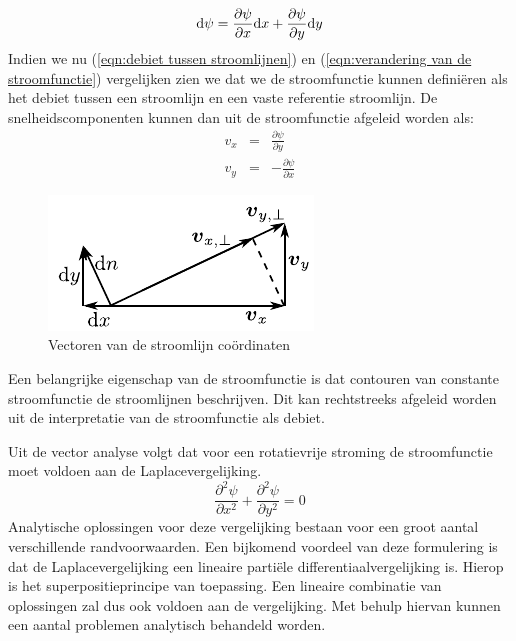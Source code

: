\begin{equation}
	\mathrm{d} \psi = \frac{\partial \psi}{\partial x} \mathrm{d} x + \frac{\partial \psi}{\partial y} \mathrm{d} y
	\label{eqn:verandering van de stroomfunctie}
\end{equation}
Indien we nu (\ref{eqn:debiet tussen stroomlijnen}) en (\ref{eqn:verandering van de stroomfunctie}) vergelijken zien we dat we de stroomfunctie kunnen definiëren als het debiet tussen een stroomlijn en een vaste referentie stroomlijn. De snelheidscomponenten kunnen dan uit de stroomfunctie afgeleid worden als:
\begin{eqnarray}
	v_x &=&  \frac{\partial \psi}{\partial y} \\
	v_y &=& -\frac{\partial \psi}{\partial x}
\end{eqnarray}
\begin{figure}[htb]
	\centering
	\includegraphics{fig/uitwendige_stroming/Stroomlijnen}
	\caption{Vectoren van de stroomlijn co\"ordinaten}
	\label{fig:Stroomlijn coordinaten}
\end{figure}
Een belangrijke eigenschap van de stroomfunctie is dat contouren van constante stroomfunctie de stroomlijnen beschrijven. Dit kan rechtstreeks afgeleid worden uit de interpretatie van de stroomfunctie als debiet.

Uit de vector analyse volgt dat voor een rotatievrije stroming de stroomfunctie moet voldoen aan de Laplacevergelijking.
\begin{equation}
	\frac{\partial^2 \psi}{\partial x^2} + \frac{\partial^2 \psi}{\partial y^2} = 0
	\label{eqn:laplacevergelijking}
\end{equation}
Analytische oplossingen voor deze vergelijking bestaan voor een groot aantal verschillende randvoorwaarden. Een bijkomend voordeel van deze formulering is dat de Laplacevergelijking een lineaire partiële differentiaalvergelijking is. Hierop is het superpositieprincipe van toepassing. Een lineaire combinatie van oplossingen zal dus ook voldoen aan de vergelijking. Met behulp hiervan kunnen een aantal problemen analytisch behandeld worden.

